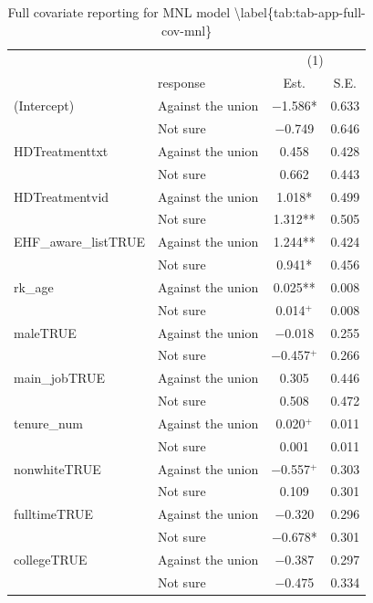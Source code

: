 \documentclass[
  11pt,
  oneside]{article}
\begin{document}
\begin{table}
\centering
\caption{\label{tab:tab-app-full-cov}Full covariate reporting for MNL model \textbackslash{}label\{tab:tab-app-full-cov-mnl\}}
\centering
\begin{threeparttable}
\begin{tabular}[t]{llcc}
\toprule
\multicolumn{2}{c}{ } & \multicolumn{2}{c}{(1)} \\
\cmidrule(l{3pt}r{3pt}){3-4}
  & response & Est. & S.E.\\
\midrule
(Intercept) & Against the union & \num{-1.586}* & \num{0.633}\\
 & Not sure & \num{-0.749} & \num{0.646}\\
HDTreatmenttxt & Against the union & \num{0.458} & \num{0.428}\\
 & Not sure & \num{0.662} & \num{0.443}\\
HDTreatmentvid & Against the union & \num{1.018}* & \num{0.499}\\
 & Not sure & \num{1.312}** & \num{0.505}\\
EHF\_aware\_listTRUE & Against the union & \num{1.244}** & \num{0.424}\\
 & Not sure & \num{0.941}* & \num{0.456}\\
rk\_age & Against the union & \num{0.025}** & \num{0.008}\\
 & Not sure & \num{0.014}$^+$ & \num{0.008}\\
maleTRUE & Against the union & \num{-0.018} & \num{0.255}\\
 & Not sure & \num{-0.457}$^+$ & \num{0.266}\\
main\_jobTRUE & Against the union & \num{0.305} & \num{0.446}\\
 & Not sure & \num{0.508} & \num{0.472}\\
tenure\_num & Against the union & \num{0.020}$^+$ & \num{0.011}\\
 & Not sure & \num{0.001} & \num{0.011}\\
nonwhiteTRUE & Against the union & \num{-0.557}$^+$ & \num{0.303}\\
 & Not sure & \num{0.109} & \num{0.301}\\
fulltimeTRUE & Against the union & \num{-0.320} & \num{0.296}\\
 & Not sure & \num{-0.678}* & \num{0.301}\\
collegeTRUE & Against the union & \num{-0.387} & \num{0.297}\\
 & Not sure & \num{-0.475} & \num{0.334}\\

\end{tabular}
\end{threeparttable}
\end{table}
\end{document}
